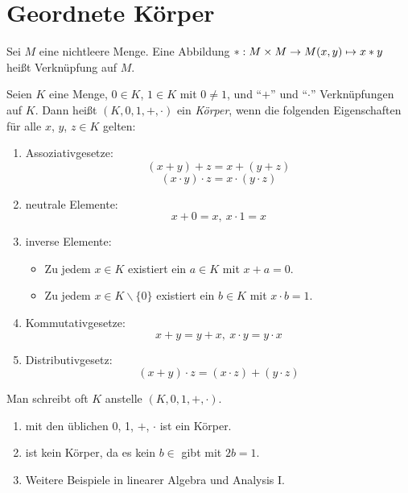 \documentclass[12pt]{scrreprt}
\begin{document}
\section{Geordnete Körper}
\label{sec:zahlen.geordnete-koerper}
\begin{dfn*}
Sei $M$ eine nichtleere Menge. Eine Abbildung $\ast: M\times M \rightarrow M(x, y) 
\mapsto x \ast y$ heißt Verknüpfung auf $M$.
\end{dfn*}

\begin{dfn}
\label{dfn:zahlen.koerper}
Seien $K$ eine Menge, $0 \in K$, $1 \in K$ mit $0 \ne 1$, und "`$+$"' und "`$\cdot$"' Verknüpfungen auf 
$K$. Dann heißt $(K, 0, 1, +, \cdot)$ ein \emph{Körper}, wenn die folgenden Eigenschaften für alle 
$x$, $y$, $z \in K$ gelten:

\begin{enumerate}
\item Assoziativgesetze:
\[(x + y) + z = x + (y + z)\]
\[(x \cdot y) \cdot z = x \cdot (y \cdot z)\]

\item neutrale Elemente:
\[x + 0 = x,\ x \cdot 1 = x\]

\item inverse Elemente:
\begin{itemize}
  \item Zu jedem $x \in K$ existiert ein $a \in K$ mit $x + a = 0$.
  \item Zu jedem $x \in K \backslash \{0\}$ existiert ein $b \in K$ mit $x \cdot b = 1$.
\end{itemize}

\item Kommutativgesetze:
\[x + y = y + x,\ x \cdot y = y \cdot x\]

\item Distributivgesetz:
\[(x + y) \cdot z = (x \cdot z) + (y \cdot z)\]
\end{enumerate}

Man schreibt oft $K$ anstelle $(K, 0, 1, +, \cdot)$.
\end{dfn}

\begin{bsp*}
\begin{enumerate}
\item {} mit den üblichen 0, 1, $+$, $\cdot$ ist ein Körper.
\item {} ist kein Körper, da es kein $b \in$  gibt mit $2b = 1$.
\item Weitere Beispiele in linearer Algebra und Analysis I.
\end{enumerate}
\end{bsp*}
\end{document}
